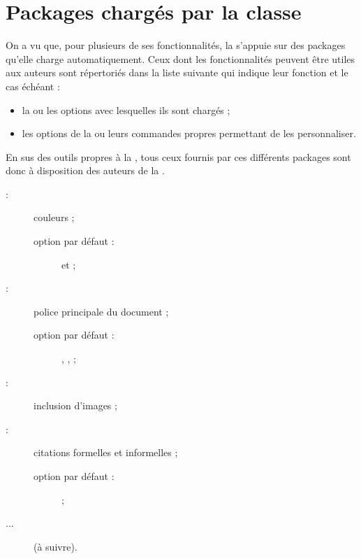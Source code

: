 \section{Packages chargés par la classe}\label{sec-packages-charges-par}

On a vu que, pour plusieurs de ses fonctionnalités, la \gztauthorcl{} s'appuie
sur des packages qu'elle charge automatiquement. Ceux dont les fonctionnalités
peuvent être utiles aux auteurs sont répertoriés dans la liste suivante qui
indique leur fonction et le cas échéant :
\begin{itemize}
\item la ou les options avec lesquelles ils sont chargés ;
\item les options de la \gztauthorcl{} ou leurs commandes propres permettant de les
  personnaliser.
\end{itemize}
En sus des outils propres à la \gztauthorcl, tous ceux fournis par ces
différents packages sont donc à disposition des auteurs de la \gzt{}.

\begin{description}
\item[ :] couleurs ;
  \begin{description}
  \item[option par défaut :]  et  ;
  \end{description}
\item[ :] police principale du document ;
  \begin{description}
  \item[option par défaut :] , ,
     ;
  \end{description}
\item[ :] inclusion d'images ;
\item[ :] citations formelles et informelles ;
  \begin{description}
  \item[option par défaut :]  ;
  \end{description}
\item[...] (à suivre).
\end{description}

